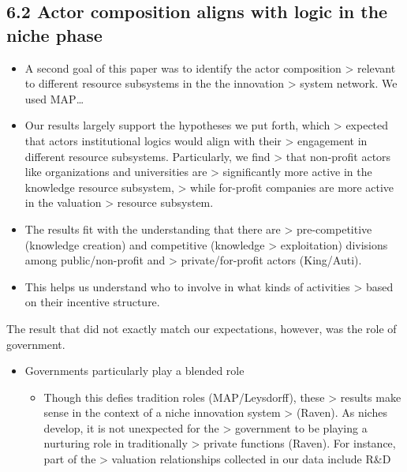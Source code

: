 \documentclass[twoside,12pt,final]{ucthesis-CA2012}
\begin{document}
\begin{ucmainmatter}
\hypertarget{actor-composition-aligns-with-logic-in-the-niche-phase}{%
\subsection{6.2 Actor composition aligns with logic in the niche phase}\label{actor-composition-aligns-with-logic-in-the-niche-phase}}
\begin{itemize}
\item
  A second goal of this paper was to identify the actor composition
  \textgreater{} relevant to different resource subsystems in the the innovation
  \textgreater{} system network. We used MAP\ldots{}
\item
  Our results largely support the hypotheses we put forth, which
  \textgreater{} expected that actors\textquotesingle{} institutional logics would align with their
  \textgreater{} engagement in different resource subsystems. Particularly, we find
  \textgreater{} that non-profit actors like organizations and universities are
  \textgreater{} significantly more active in the knowledge resource subsystem,
  \textgreater{} while for-profit companies are more active in the valuation
  \textgreater{} resource subsystem.
\item
  The results fit with the understanding that there are
  \textgreater{} pre-competitive (knowledge creation) and competitive (knowledge
  \textgreater{} exploitation) divisions among public/non-profit and
  \textgreater{} private/for-profit actors (King/Auti).
\item
  This helps us understand who to involve in what kinds of activities
  \textgreater{} based on their incentive structure.
\end{itemize}
The result that did not exactly match our expectations, however, was the
role of government.
\begin{itemize}
\item
  Governments particularly play a blended role
  \begin{itemize}
  \item
    Though this defies \textquotesingle tradition\textquotesingle{} roles (MAP/Leysdorff), these
    \textgreater{} results make sense in the context of a niche innovation system
    \textgreater{} (Raven). As niches develop, it is not unexpected for the
    \textgreater{} government to be playing a nurturing role in traditionally
    \textgreater{} \textquotesingle private\textquotesingle{} functions (Raven). For instance, part of the
    \textgreater{} valuation relationships collected in our data include R\&D

\end{itemize}
\end{itemize}
\end{ucmainmatter}
\end{document}
